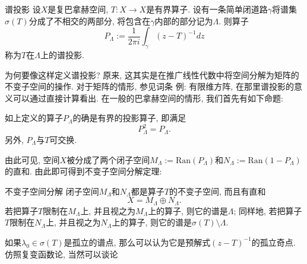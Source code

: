 

\begin{definition}{谱投影}
设$X$是复巴拿赫空间, $T:X\to X$是有界算子. 设有一条简单闭道路$\gamma$将谱集$\sigma(T)$分成了不相交的两部分, 将包含在$\gamma$内部的部分记为$\Lambda$. 则算子
$$
P_\Lambda:=\frac{1}{2\pi i}\int_\gamma(z-T)^{-1}dz
$$
称为$T$在$\Lambda$上的谱投影.
\end{definition}

为何要像这样定义谱投影? 原来, 这其实是在推广线性代数中将空间分解为矩阵的不变子空间的操作. 对于矩阵的情形, 参见词条 例: 有限维方阵, 在那里谱投影的意义可以通过直接计算看出. 在一般的巴拿赫空间的情形, 我们首先有如下命题:

\begin{lemma}{}
如上定义的算子$P_\Lambda$的确是有界的投影算子, 即满足
$$
P_\Lambda^2=P_\Lambda.
$$
另外, $P_\Lambda$与$T$可交换.
\end{lemma}

由此可见, 空间$X$被分成了两个闭子空间$M_\Lambda:=\text{Ran}(P_\Lambda)$和$N_\Lambda:=\text{Ran}(1-P_\Lambda)$的直和. 由此即可得到不变子空间分解定理:

\begin{theorem}{不变子空间分解}
闭子空间$M_\Lambda$和$N_\Lambda$都是算子$T$的不变子空间, 而且有直和
$$
X=M_\Lambda\oplus N_\Lambda.
$$
若把算子$T$限制在$M_\Lambda$上, 并且视之为$M_\Lambda$上的算子, 则它的谱是$\Lambda$; 同样地, 若把算子$T$限制在$N_\Lambda$上, 并且视之为$N_\Lambda$上的算子, 则它的谱是$\sigma(T)\setminus\Lambda$.
\end{theorem}

如果$\lambda_0\in\sigma(T)$是孤立的谱点, 那么可以认为它是预解式$(z-T)^{-1}$的孤立奇点. 仿照复变函数论, 当然可以谈论